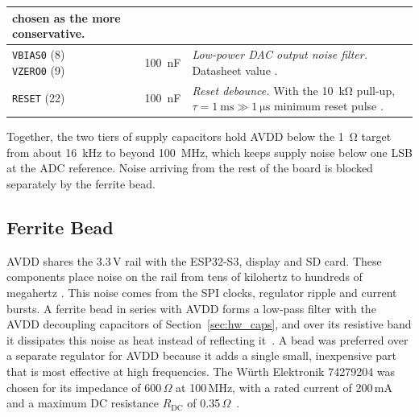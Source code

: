 \begin{table}[H]
\begin{tabularx}{\textwidth}{@{}l l >{\raggedright\arraybackslash}X@{}}
        chosen as the more conservative. \\
    \midrule
    \capstack{\texttt{VBIAS0} (8) \\ \texttt{VZERO0} (9)}
      & \SI{100}{\nano\farad}
      & \textit{Low-power DAC output noise filter.} Datasheet value
        \cite[p.~20]{ad5941_ds}. \\
    \midrule
    \texttt{RESET} (22) & \SI{100}{\nano\farad}
      & \textit{Reset debounce.} With the \SI{10}{\kilo\ohm} pull-up,
        $\tau = \SI{1}{\milli\second} \gg \SI{1}{\micro\second}$ minimum
        reset pulse \cite[p.~14]{ad5941_ds}. \\
    \bottomrule
  \end{tabularx}
\end{table}

Together, the two tiers of supply capacitors hold AVDD below the
\SI{1}{\ohm} target from about \SI{16}{\kilo\hertz} to beyond
\SI{100}{\mega\hertz}, which keeps supply noise below one LSB at the ADC
reference. Noise arriving from the rest of the board is
blocked separately by the ferrite bead.
 
\subsection{Ferrite Bead}
\label{sec:hw_ferrite}
AVDD shares the 3.3\,V rail with the ESP32-S3, display and SD card. These components
place noise on the rail from tens of kilohertz to hundreds of megahertz \cite{eco2016ferrite}. This noise comes
from the SPI clocks, regulator ripple and current bursts. A ferrite bead in series with
AVDD forms a low-pass filter with the AVDD decoupling capacitors of
Section~\ref{sec:hw_caps}, and over its resistive band it dissipates
this noise as heat instead of reflecting it~\cite{eco2016ferrite}. A bead was
preferred over a separate regulator for AVDD because it adds a single small, inexpensive
part that is most effective at high frequencies. The W\"urth Elektronik 74279204 was chosen for its impedance of 600\,$\Omega$ at 100\,MHz, with a rated
current of 200\,mA and a maximum DC resistance $R_\mathrm{DC}$ of
0.35\,$\Omega$~\cite{wurth74279204}.

